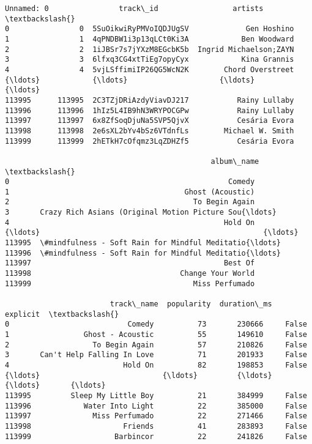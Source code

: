 \documentclass[11pt]{article}
\makeatletter
\newcommand{\boxspacing}{\kern\kvtcb@left@rule\kern\kvtcb@boxsep}
\newcommand{\prompt}[4]{
        {\ttfamily\llap{{\color{#2}[#3]:\hspace{3pt}#4}}\vspace{-\baselineskip}}
    }
\makeatother
\begin{document}
            \begin{tcolorbox}[breakable, size=fbox, boxrule=.5pt, pad at break*=1mm, opacityfill=0]
\prompt{Out}{outcolor}{52}{\boxspacing}
\begin{Verbatim}[commandchars=\\\{\}]
        Unnamed: 0                track\_id                 artists  \textbackslash{}
0                0  5SuOikwiRyPMVoIQDJUgSV             Gen Hoshino
1                1  4qPNDBW1i3p13qLCt0Ki3A            Ben Woodward
2                2  1iJBSr7s7jYXzM8EGcbK5b  Ingrid Michaelson;ZAYN
3                3  6lfxq3CG4xtTiEg7opyCyx            Kina Grannis
4                4  5vjLSffimiIP26QG5WcN2K        Chord Overstreet
{\ldots}            {\ldots}                     {\ldots}                     {\ldots}
113995      113995  2C3TZjDRiAzdyViavDJ217           Rainy Lullaby
113996      113996  1hIz5L4IB9hN3WRYPOCGPw           Rainy Lullaby
113997      113997  6x8ZfSoqDjuNa5SVP5QjvX           Cesária Evora
113998      113998  2e6sXL2bYv4bSz6VTdnfLs        Michael W. Smith
113999      113999  2hETkH7cOfqmz3LqZDHZf5           Cesária Evora

                                               album\_name  \textbackslash{}
0                                                  Comedy
1                                        Ghost (Acoustic)
2                                          To Begin Again
3       Crazy Rich Asians (Original Motion Picture Sou{\ldots}
4                                                 Hold On
{\ldots}                                                   {\ldots}
113995  \#mindfulness - Soft Rain for Mindful Meditatio{\ldots}
113996  \#mindfulness - Soft Rain for Mindful Meditatio{\ldots}
113997                                            Best Of
113998                                  Change Your World
113999                                     Miss Perfumado

                        track\_name  popularity  duration\_ms  explicit  \textbackslash{}
0                           Comedy          73       230666     False
1                 Ghost - Acoustic          55       149610     False
2                   To Begin Again          57       210826     False
3       Can't Help Falling In Love          71       201933     False
4                          Hold On          82       198853     False
{\ldots}                            {\ldots}         {\ldots}          {\ldots}       {\ldots}
113995         Sleep My Little Boy          21       384999     False
113996            Water Into Light          22       385000     False
113997              Miss Perfumado          22       271466     False
113998                     Friends          41       283893     False
113999                   Barbincor          22       241826     False


\end{Verbatim}
\end{tcolorbox}
\end{document}

